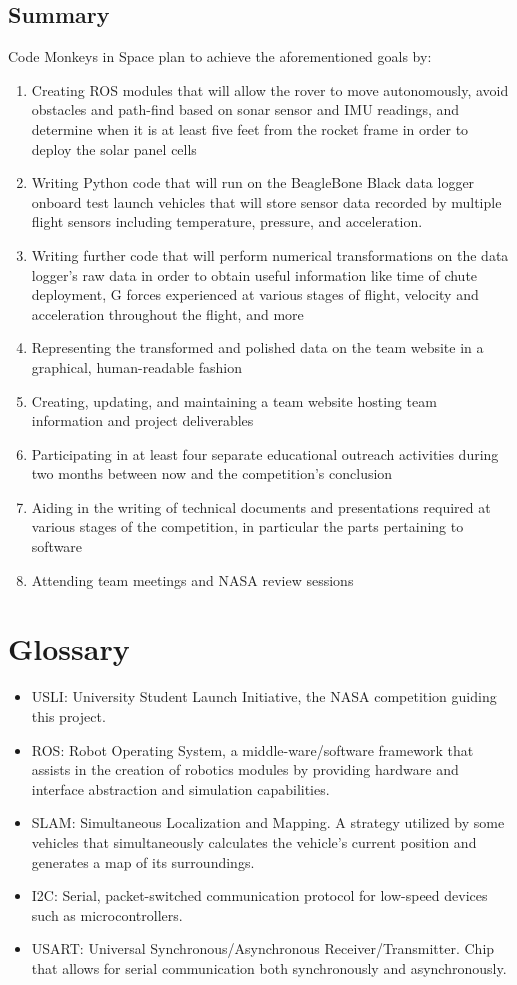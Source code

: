 \documentclass[onecolumn, draftclsnofoot,10pt, compsoc]{IEEEtran}
\begin{document}
\subsection{Summary}
Code Monkeys in Space plan to achieve the aforementioned goals by:
\begin{enumerate}
\item Creating ROS modules that will allow the rover to move autonomously, avoid obstacles and path-find based on sonar sensor and IMU readings, and determine when it is at least five feet from the rocket frame in order to deploy the solar panel cells
\item Writing Python code that will run on the BeagleBone Black data logger onboard test launch vehicles that will store sensor data recorded by multiple flight sensors including temperature, pressure, and acceleration.
\item Writing further code that will perform numerical transformations on the data logger's raw data in order to obtain useful information like time of chute deployment, G forces experienced at various stages of flight, velocity and acceleration throughout the flight, and more
\item Representing the transformed and polished data on the team website in a graphical, human-readable fashion
\item Creating, updating, and maintaining a team website hosting team information and project deliverables
\item Participating in at least four separate educational outreach activities during two months between now and the competition's conclusion
\item Aiding in the writing of technical documents and presentations required at various stages of the competition, in particular the parts pertaining to software
\item Attending team meetings and NASA review sessions
\end{enumerate}

\section{Glossary}

\begin{itemize}
	\item USLI: University Student Launch Initiative, the NASA competition guiding this project.
    \item ROS: Robot Operating System, a middle-ware/software framework that assists in the creation of robotics modules by providing hardware and interface abstraction and simulation capabilities.
    \item SLAM: Simultaneous Localization and Mapping. A strategy utilized by some vehicles that simultaneously calculates the vehicle's current position and generates a map of its surroundings.
    \item I2C: Serial, packet-switched communication protocol for low-speed devices such as microcontrollers.
    \item USART: Universal Synchronous/Asynchronous Receiver/Transmitter. Chip that allows for serial communication both synchronously and asynchronously.
\end{itemize}
\end{document}
